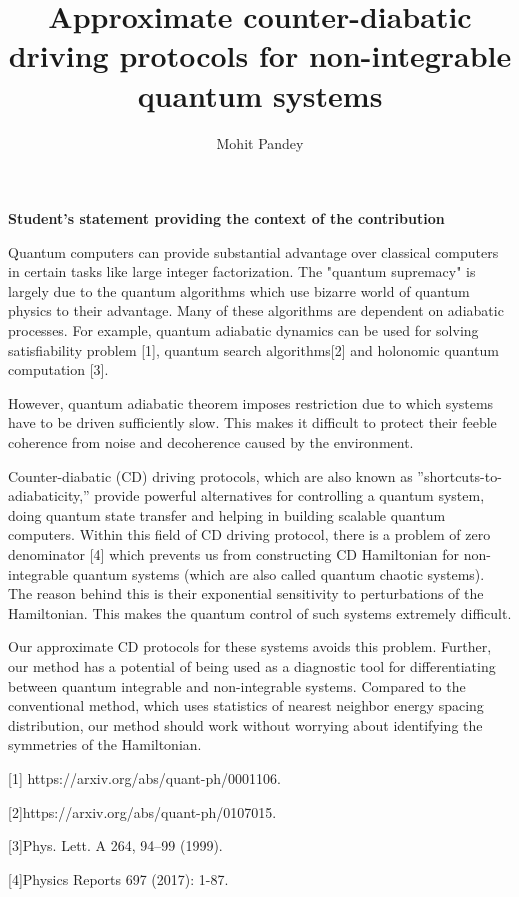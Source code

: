 \documentclass[11pt,a4paper]{article}
\author{Mohit Pandey}
\title{Approximate counter-diabatic driving protocols for non-integrable quantum systems  }
\begin{document}
\maketitle
\textbf{Student's statement  providing the context of the contribution}


Quantum computers can provide substantial advantage over classical computers in certain tasks like large integer factorization. The "quantum supremacy" is largely due to the quantum algorithms which use bizarre world of quantum physics to their advantage. Many of these algorithms are dependent on adiabatic processes. For example, quantum adiabatic dynamics can be used for solving satisfiability problem [1], quantum search algorithms[2] and  holonomic quantum computation [3]. 

However, quantum adiabatic theorem imposes restriction due to which systems have to be driven sufficiently slow. This makes it difficult to protect their feeble coherence from noise and decoherence caused by the environment.


Counter-diabatic (CD) driving protocols, which are also known as ”shortcuts-to-adiabaticity,” provide powerful alternatives for controlling a quantum system, doing quantum state transfer and helping in building scalable quantum computers. Within this field of CD driving protocol, there is a problem of zero denominator  [4] which prevents us from constructing CD Hamiltonian for non-integrable quantum systems (which are also called quantum chaotic systems). The reason behind this is their exponential sensitivity to perturbations of the Hamiltonian. This makes the quantum control  of such systems extremely difficult.

Our approximate CD protocols for these systems avoids this problem. Further, our method has a potential of being used as a diagnostic tool for differentiating between quantum integrable and non-integrable systems. Compared to the conventional method, which uses statistics of nearest neighbor energy spacing distribution, our method should work without worrying about identifying the symmetries of the Hamiltonian. 

[1] https://arxiv.org/abs/quant-ph/0001106.

[2]https://arxiv.org/abs/quant-ph/0107015.

[3]Phys. Lett. A 264, 94–99 (1999).

[4]Physics Reports 697 (2017): 1-87.
\end{document}
